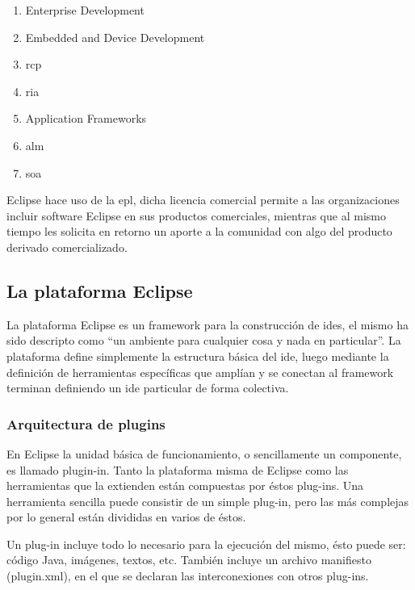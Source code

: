\documentclass[a4paper,12pt,oneside,spanish]{book}
\begin{document}
\begin{enumerate}

\item Enterprise Development

\item Embedded and Device Development

\item \gls{rcp}

\item \gls{ria}

\item Application Frameworks

\item \gls{alm}

\item \gls{soa}

\end{enumerate}

Eclipse hace uso de la \gls{epl}, dicha licencia comercial permite a las organizaciones incluir software Eclipse en sus productos comerciales, mientras que al mismo tiempo les solicita en retorno un aporte a la comunidad con algo del producto derivado comercializado.


\subsection{La plataforma Eclipse}
\label{subsec:PlatEclipse}

La plataforma Eclipse es un framework para la construcción de \glspl{ide}, el mismo ha sido descripto como ``un ambiente para cualquier cosa y nada en particular''. La plataforma define simplemente la estructura básica del \gls{ide}, luego mediante la definición de herramientas específicas que amplían y se conectan al framework terminan definiendo un \gls{ide} particular de forma colectiva.


\subsubsection{Arquitectura de plugins}

En Eclipse la unidad básica de funcionamiento, o sencillamente un componente, es llamado plugin-in. Tanto la plataforma misma de Eclipse como las herramientas que la extienden están compuestas por éstos plug-ins. Una herramienta sencilla puede consistir de un simple plug-in, pero las más complejas por lo general están divididas en varios de éstos.

Un plug-in incluye todo lo necesario para la ejecución del mismo, ésto puede ser: código Java, imágenes, textos, etc. También incluye un archivo manifiesto (plugin.xml), en el que se declaran las interconexiones con otros plug-ins.
\end{document}
